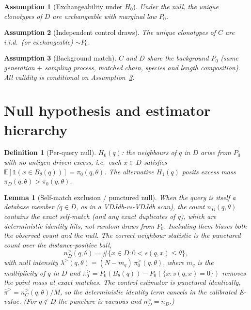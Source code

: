 \documentclass[11pt]{article}
\theoremstyle{oldplain}
\newtheorem{lemma}{Lemma}
\theoremstyle{oldrem}
\newtheorem{definition}{Definition}
\newtheorem{assumption}{Assumption}
\newcommand{\Pzero}{P_{0}}
\newcommand{\ball}[2]{B_{#1}(#2)}
\newcommand{\E}{\mathbb{E}}
\newcommand{\one}{\mathds{1}}
\begin{document}
\begin{assumption}[Exchangeability under $H_0$]\label{ass:exch}
Under the null, the unique clonotypes of $D$ are exchangeable with marginal law $\Pzero$.
\end{assumption}
\begin{assumption}[Independent control draws]\label{ass:indep}
The unique clonotypes of $C$ are i.i.d.\ (or exchangeable) $\sim \Pzero$.
\end{assumption}
\begin{assumption}[Background match]\label{ass:match}
$C$ and $D$ share the background $\Pzero$ (same generation $+$ sampling process, matched chain,
species and length composition). All validity is conditional on Assumption~\ref{ass:match}.
\end{assumption}

\section{Null hypothesis and estimator hierarchy}\label{sec:null}

\begin{definition}[Per-query null]
$H_0(q)$: the neighbours of $q$ in $D$ arise from $\Pzero$ with no antigen-driven excess, i.e.\
each $x\in D$ satisfies $\E[\one(x\in\ball{\theta}{q})] = \pi_0(q,\theta)$. The alternative
$H_1(q)$ posits excess mass $\pi_D(q,\theta) > \pi_0(q,\theta)$.
\end{definition}

\begin{lemma}[Self-match exclusion / punctured null]\label{lem:selfmatch}
When the query is itself a database member ($q\in D$, as in a VDJdb-vs-VDJdb scan), the count
$n_D(q,\theta)$ contains the exact self-match (and any exact duplicates of $q$), which are
\emph{deterministic} identity hits, not random draws from $\Pzero$. Including them biases both the
observed count and the null. The correct neighbour statistic is the \emph{punctured} count over the
distance-positive ball,
\begin{equation}\label{eq:punctured}
  n_D^{>}(q,\theta) = \#\{x\in D : 0 < s(q,x) \le \theta\},
\end{equation}
with null intensity $\lambda^{>}(q,\theta) = (N-m_q)\,\pi_0^{>}(q,\theta)$, where $m_q$ is the
multiplicity of $q$ in $D$ and $\pi_0^{>} = \Pzero(\ball{\theta}{q}) - \Pzero(\{x:s(q,x)=0\})$ removes
the point mass at exact matches. The control estimator is punctured identically,
$\hat\pi^{>} = n_C^{>}(q,\theta)/M$, so the deterministic identity term cancels in the calibrated
E-value. (For $q\notin D$ the puncture is vacuous and $n_D^{>}=n_D$.)
\end{lemma}
\end{document}
